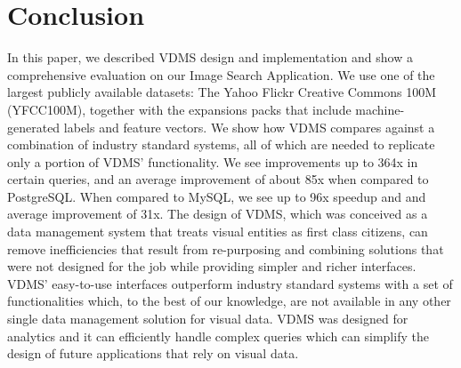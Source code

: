 \section{Conclusion}
In this paper, we described VDMS design and implementation and 
show a comprehensive evaluation on our Image Search Application. 
We use one of the largest publicly available datasets: 
The Yahoo Flickr Creative Commons 100M (YFCC100M), 
together with the expansions packs that include 
machine-generated labels and feature vectors.
We show how VDMS compares against a combination of 
industry standard systems, all of which are needed to 
replicate only a portion of VDMS' functionality. 
We see improvements up to 364x in certain queries, 
and an average improvement of about 85x when compared to PostgreSQL.
When compared to MySQL, we see up to 96x speedup
and and average improvement of 31x. 
The design of VDMS, which was conceived as a 
data management system that treats visual entities 
as first class citizens, can remove inefficiencies 
that result from re-purposing and combining solutions
that were not designed for the job while providing 
simpler and richer interfaces. 
VDMS' easy-to-use interfaces outperform industry standard systems
with a set of functionalities which, to the best of our knowledge,
are not available in any other single data management solution for visual data.
VDMS was designed for analytics and it can efficiently handle complex queries 
which can simplify the design of future applications that rely on visual data.
